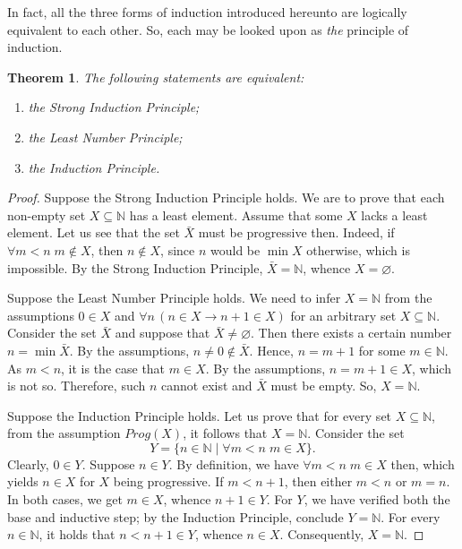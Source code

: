 \documentclass[12pt,notitlepage]{article}
\theoremstyle{plain}
\newtheorem{thm}{Theorem}[section]
\theoremstyle{definition}
\theoremstyle{plain}
\newcommand{\N}{\mathbb{N}}
\newcommand{\sbs}{\subseteq}
\newcommand{\void}{\varnothing}
\newcommand{\1}{\mathbf{1}}
\newcommand{\0}{\mathbf{0}}
\newcommand{\mcomm}[1]{}
\begin{document}
In fact, all the three forms of induction introduced hereunto are logically equivalent to each other. So, each may be looked upon as \emph{the} principle of induction.
\begin{thm}
The following statements are equivalent:
\begin{enumerate}
\item the Strong Induction Principle;
\item the Least Number Principle;
\item the Induction Principle.
\end{enumerate}
\end{thm}
\mcomm{We use straightforward but abstract logical manipulations in order to prove this theorem. They pose a serious challenge for many students. Nevertheless, we prefer to make the students ``eat the frog'' now---just spending more time on this proof. In my experience, the `predicate' version of this proof is no better, whereas the `predicate' forms of the induction principle might be so for some audiences.}
\begin{proof}
Suppose the Strong Induction Principle holds. We are to prove that each non-empty set $X \sbs \N$ has a least element. Assume that some $X$ lacks a least element. Let us see that the set $\bar X$ must be progressive then. Indeed, if $\forall m < n\; m \notin X$, then $n \notin X$, since $n$ would be $\min X$ otherwise, which is impossible. By the Strong Induction Principle, $\bar X = \N$, whence $X = \void$.

Suppose the Least Number Principle holds. We need to infer $X = \N$ from the assumptions $0 \in X$ and $\forall n\, (n \in X \to n+1 \in X)$ for an arbitrary set $X \sbs \N$. Consider the set $\bar X$ and suppose that $\bar X \neq \void$. Then there exists a certain number $n = \min \bar X$. By the assumptions, $n \neq 0 \notin \bar X$. Hence, $n = m + 1$ for some $m \in \N$. As $m < n$, it is the case that $m \in X$. By the assumptions, $n = m + 1  \in X$, which is not so. Therefore, such $n$ cannot exist and $\bar X$ must be empty. So, $X = \N$.

Suppose the Induction Principle holds. Let us prove that for every set $X \sbs \N$, from the assumption $Prog(X)$, it follows that $X =\N$. Consider the set
$$Y = \{ n \in \N \mid \forall m < n\; m \in X \}.$$
Clearly, $0 \in Y$. Suppose $n \in Y$. By definition, we have $\forall m < n\; m \in X$ then, which yields $n \in X$ for $X$ being progressive. If $m < n + 1$, then either $m < n$ or $m = n$. In both cases, we get $m \in X$, whence $n + 1\in Y$. For $Y$, we have verified both the base and inductive step; by the Induction Principle, conclude $Y = \N$. For every $n \in \N$, it holds that $n < n + 1 \in Y$, whence $n \in X$. Consequently, $X = \N$.
\end{proof}
\end{document}
